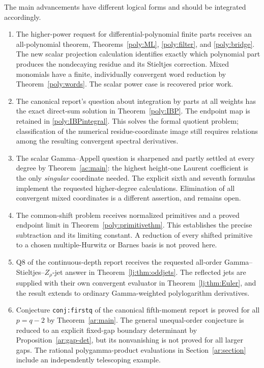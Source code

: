 The main advancements have different logical forms and should be
integrated accordingly.
\begin{enumerate}
\item The higher-power request for differential-polynomial finite parts
receives an all-polynomial theorem, Theorems~\ref{poly:ML},
\ref{poly:filter}, and \ref{poly:bridge}. The new scalar projection
calculation identifies exactly which polynomial part produces the
nondecaying residue and its Stieltjes correction. Mixed monomials have
a finite, individually convergent word reduction by
Theorem~\ref{poly:words}. The scalar power case is recovered prior work.

\item The canonical report's question about integration by parts at all
weights has the exact direct-sum solution in
Theorem~\ref{poly:IBP}. The endpoint map is retained in
\eqref{poly:IBPintegral}. This solves the formal quotient problem;
classification of the numerical residue-coordinate image still requires
relations among the resulting convergent spectral derivatives.

\item The scalar Gamma--Appell question is sharpened and partly settled
at every degree by Theorem~\ref{ac:main}: the highest height-one Laurent
coefficient is the only \emph{singular} coordinate needed. The explicit
sixth and seventh formulas implement the requested higher-degree
calculations. Elimination of all convergent mixed coordinates is a
different assertion, and remains open.

\item The common-shift problem receives normalized primitives and a
proved endpoint limit in Theorem~\ref{poly:primitivethm}. This establishes
the precise subtraction and its limiting constant. A reduction of every
shifted primitive to a chosen multiple-Hurwitz or Barnes basis is not
proved here.

\item Q8 of the continuous-depth report receives the requested all-order
Gamma--Stieltjes--$Z_\rho$-jet answer in
Theorem~\ref{lj:thm:oddjets}. The reflected jets are supplied with their
own convergent evaluator in Theorem~\ref{lj:thm:Euler}, and the result
extends to ordinary Gamma-weighted polylogarithm derivatives.

\item Conjecture \texttt{conj:firstq} of the canonical fifth-moment
report is proved for all $p=q-2$ by Theorem~\ref{ar:main}.
The general unequal-order conjecture is reduced to an explicit
fixed-gap boundary determinant by Proposition~\ref{ar:gap-det}, but
its nonvanishing is not proved for all larger gaps. The rational
polygamma-product evaluations in Section~\ref{ar:section} include
an independently telescoping example.
\end{enumerate}

